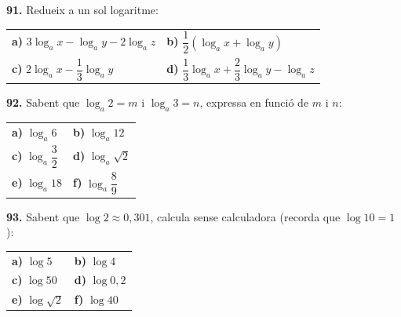 \documentclass[13pt,a4paper]{extarticle}
\begin{document}
\par\noindent\begin{minipage}{\linewidth}
\textbf{91.} Redueix a un sol logaritme:\par

\begin{tabular}{@{}p{.46\linewidth}p{.46\linewidth}@{}}
\textbf{a)} $3\log_a x-\log_a y-2\log_a z$ & \textbf{b)} $\dfrac12\left(\log_a x+\log_a y\right)$ \\[2pt]
\textbf{c)} $2\log_a x-\dfrac13\log_a y$ & \textbf{d)} $\dfrac13\log_a x+\dfrac23\log_a y-\log_a z$ \\[2pt]
\end{tabular}\par
\end{minipage}\par\vspace{1.6mm}
\par\noindent\begin{minipage}{\linewidth}
\textbf{92.} Sabent que $\log_a 2=m$ i $\log_a 3=n$, expressa en funció de $m$ i $n$:\par

\begin{tabular}{@{}p{.46\linewidth}p{.46\linewidth}@{}}
\textbf{a)} $\log_a 6$ & \textbf{b)} $\log_a 12$ \\[2pt]
\textbf{c)} $\log_a \dfrac{3}{2}$ & \textbf{d)} $\log_a \sqrt{2}$ \\[2pt]
\textbf{e)} $\log_a 18$ & \textbf{f)} $\log_a \dfrac{8}{9}$ \\[2pt]
\end{tabular}\par
\end{minipage}\par\vspace{1.6mm}
\par\noindent\begin{minipage}{\linewidth}
\textbf{93.} Sabent que $\log 2 \approx 0{,}301$, calcula sense calculadora (recorda que $\log 10=1$):\par

\begin{tabular}{@{}p{.46\linewidth}p{.46\linewidth}@{}}
\textbf{a)} $\log 5$ & \textbf{b)} $\log 4$ \\[2pt]
\textbf{c)} $\log 50$ & \textbf{d)} $\log 0{,}2$ \\[2pt]
\textbf{e)} $\log \sqrt{2}$ & \textbf{f)} $\log 40$ \\[2pt]
\end{tabular}\par
\end{minipage}\par\vspace{1.6mm}
\end{document}

